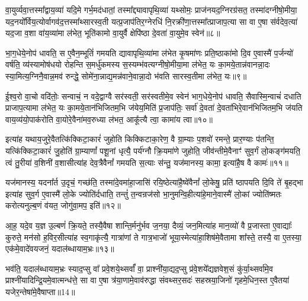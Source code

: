 वा॒युर्व्यवा॒त्तस्मा᳚द्वाय॒व्या॑ यदि॒मे गर्भ॒मद॑धातां॒ तस्मा᳚द्द्यावापृथि॒व्या॑ यथ्सोमः॒ प्राज॑नयद॒ग्निरग्र॑सत॒ तस्मा॑दग्नीषो॒मीया॒ यद॒नयो᳚र्विय॒त्योर्वागव॑द॒त्तस्मा᳚थ्सारस्व॒ती यत्प्र॒जाप॑तिर॒ग्नेरधि॑ नि॒रक्री॑णा॒त्तस्मा᳚त्प्राजाप॒त्या सा वा ए॒षा स॑र्वदेव॒त्या॑ यद॒जा व॒शा वा॑य॒व्या॑मा ल॑भेत॒ भूति॑कामो वा॒युर्वै क्षेपि॑ष्ठा दे॒वता॑ वा॒युमे॒व स्वेन॑॥८॥

भा॒ग॒धेये॒नोप॑ धावति॒ स ए॒वैन॒म्भूतिं॑ गमयति द्यावापृथि॒व्या॑मा ल॑भेत कृ॒षमा॑णः प्रति॒ष्ठाका॑मो दि॒व ए॒वास्मै॑ प॒र्जन्यो॑ वर्\mbox{}षति॒ व्य॑स्यामोष॑धयो रोहन्ति स॒मर्धु॑कमस्य स॒स्यम्भ॑वत्यग्नीषो॒मीया॒मा ल॑भेत॒ यः का॒मये॒तान्न॑वानन्ना॒दः स्या॒मित्य॒ग्निनै॒वान्न॒मव॑ रुन्द्धे॒ सोमे॑ना॒न्नाद्य॒मन्न॑वाने॒वान्ना॒दो भ॑वति सारस्व॒तीमा ल॑भेत॒ यः॥९॥

ई॒श्व॒रो वा॒चो वदि॑तोः॒ सन्वाचं॒ न वदे॒द्वाग्वै सर॑स्वती॒ सर॑स्वतीमे॒व स्वेन॑ भाग॒धेये॒नोप॑ धावति॒ सैवास्मि॒न्वाचं॑ दधाति प्राजाप॒त्यामा ल॑भेत॒ यः का॒मये॒तान॑भिजितम॒भि ज॑येय॒मिति॑ प्र॒जाप॑तिः॒ सर्वा॑ दे॒वता॑ दे॒वता॑भिरे॒वान॑भि\-जितम॒भि ज॑यति वाय॒व्य॑यो॒पाक॑रोति वा॒योरे॒वैना॑मव॒रुध्या ल॑भत॒ आकू᳚त्यै त्वा॒ कामा॑य त्वा॥१०॥

इत्या॑ह यथाय॒जुरे॒वैतत्कि॑क्किटा॒कारं॑ जुहोति किक्किटाका॒रेण॒ वै ग्रा॒म्याः प॒शवो॑ रमन्ते॒ प्रार॒ण्याः प॑तन्ति॒ यत्कि॑क्किटा॒कारं॑ जु॒होति॑ ग्रा॒म्याणां᳚ पशू॒नां धृत्यै॒ पर्य॑ग्नौ क्रि॒यमा॑णे जुहोति॒ जीव॑न्तीमे॒वैनाꣳ॑ सुव॒र्गं लो॒कङ्ग॑मयति॒ त्वं तु॒रीया॑ व॒शिनी॑ व॒शासीत्या॑ह देव॒त्रैवैनां᳚ गमयति स॒त्याः स॑न्तु॒ यज॑मानस्य॒ कामा॒ इत्या॑है॒ष वै कामः॑॥११॥

यज॑मानस्य॒ यदना᳚र्त उ॒दृचं॒ गच्छ॑ति॒ तस्मा॑दे॒वमा॑हा॒जासि॑ रयि॒ष्ठेत्या॑है॒ष्वे॑वैनां᳚ लो॒केषु॒ प्रति॑ ष्ठापयति दि॒वि ते॑ बृ॒हद्भा इत्या॑ह सुव॒र्ग ए॒वास्मै॑ लो॒के ज्योति॑र्दधाति॒ तन्तुं॑ त॒न्वन्रज॑सो भा॒नुमन्वि॒हीत्या॑हे॒माने॒वास्मै॑ लो॒कां ज्योति॑ष्मतः करोत्यनुल्ब॒णं व॑यत॒ जोगु॑वा॒मप॒ इति॑॥१२॥

आ॒ह॒ यदे॒व य॒ज्ञ उ॒ल्बणं॑ क्रि॒यते॒ तस्यै॒वैषा शान्ति॒र्मनु॑र्भव ज॒नया॒ दैव्यं॒ जन॒मित्या॑ह मान॒व्यो॑ वै प्र॒जास्ता ए॒वाद्याः᳚ कुरुते॒ मन॑सो ह॒विर॒सीत्या॑ह स्व॒गाकृ॑त्यै॒ गात्रा॑णां ते गात्र॒भाजो॑ भूया॒स्मेत्या॑हा॒शिष॑मे॒वैतामा शा᳚स्ते॒ तस्यै॒ वा ए॒तस्या॒ एक॑मे॒वादे॑वयजनं॒ यदाल॑ब्धायाम॒भ्रः॥१३॥

भव॑ति॒ यदाल॑ब्धायाम॒भ्रः स्याद॒प्सु वा᳚ प्रवे॒शये॒थ्सर्वां᳚ वा॒ प्राश्नी॑या॒द्यद॒प्सु प्र॑वे॒शये᳚द्यज्ञवेश॒सं कु॑र्या॒थ्सर्वा॑मे॒व प्राश्नी॑यादिन्द्रि॒यमे॒वात्मन्ध॑त्ते॒ सा वा ए॒षा त्र॑या॒णामे॒वाव॑रुद्धा संवथ्सर॒सदः॑ सहस्रया॒जिनो॑ गृहमे॒धिन॒स्त ए॒वैतया॑ यजेर॒न्तेषा॑मे॒वैषाप्ता॥14॥

{\anuvakamend[{यथ्स्वेन॑ सारस्व॒तीमा ल॑भेत॒ यः कामा॑य त्वा॒ कामो\-ऽप॒ इत्य॒भ्रो द्विच॑त्वारिꣳशच्च॥३॥}]}

